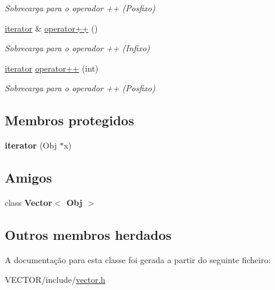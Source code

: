 \begin{DoxyCompactItemize}
\begin{DoxyCompactList}\small\item\em Sobrecarga para o operador ++ (Posfixo) \end{DoxyCompactList}\item 
\hyperlink{class_vector_1_1iterator}{iterator} \& \hyperlink{class_vector_1_1iterator_ab48c26866ff8e1792ed576cee7a41aca}{operator++} ()\hypertarget{class_vector_1_1iterator_ab48c26866ff8e1792ed576cee7a41aca}{}\label{class_vector_1_1iterator_ab48c26866ff8e1792ed576cee7a41aca}

\begin{DoxyCompactList}\small\item\em Sobrecarga para o operador ++ (Infixo) \end{DoxyCompactList}\item 
\hyperlink{class_vector_1_1iterator}{iterator} \hyperlink{class_vector_1_1iterator_a1c3d9ac3129b200ec59fe68de7dddaee}{operator++} (int)\hypertarget{class_vector_1_1iterator_a1c3d9ac3129b200ec59fe68de7dddaee}{}\label{class_vector_1_1iterator_a1c3d9ac3129b200ec59fe68de7dddaee}

\begin{DoxyCompactList}\small\item\em Sobrecarga para o operador ++ (Posfixo) \end{DoxyCompactList}\end{DoxyCompactItemize}
\subsection*{Membros protegidos}
\begin{DoxyCompactItemize}
\item 
{\bfseries iterator} (Obj $\ast$x)\hypertarget{class_vector_1_1iterator_a1d85d1cd4c77489a8db6fb5dd12b47f9}{}\label{class_vector_1_1iterator_a1d85d1cd4c77489a8db6fb5dd12b47f9}

\end{DoxyCompactItemize}
\subsection*{Amigos}
\begin{DoxyCompactItemize}
\item 
class {\bfseries Vector$<$ Obj $>$}\hypertarget{class_vector_1_1iterator_a93580d986919dca737b45fdf1c366bfa}{}\label{class_vector_1_1iterator_a93580d986919dca737b45fdf1c366bfa}

\end{DoxyCompactItemize}
\subsection*{Outros membros herdados}


A documentação para esta classe foi gerada a partir do seguinte ficheiro\+:\begin{DoxyCompactItemize}
\item 
V\+E\+C\+T\+O\+R/include/\hyperlink{vector_8h}{vector.\+h}\end{DoxyCompactItemize}
